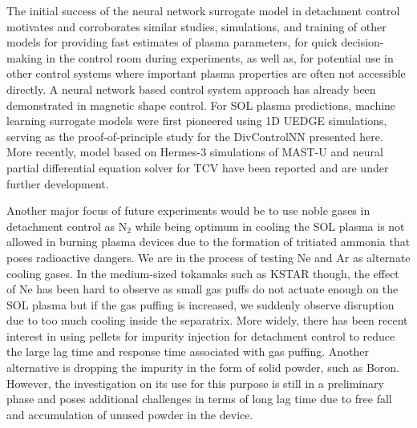 The initial success of the neural network surrogate model in detachment control motivates and corroborates similar studies, simulations, and training of other models for providing fast estimates of plasma parameters, for quick decision-making in the control room during experiments, as well as, for potential use in other control systems where important plasma properties are often not accessible directly.
A neural network based control system approach has already been demonstrated in magnetic shape control\cite{Degrave_2022_Nature}.
For \ac{SOL} plasma predictions, machine learning surrogate models were first pioneered using 1D UEDGE simulations\cite{Zhu_2022_JPP}, serving as the proof-of-principle study for the DivControlNN presented here. More recently, model based on Hermes-3\cite{Dudson_2024_CPC} simulations of MAST-U\cite{Holt_2024_NF} and neural partial differential equation solver for TCV\cite{Poels_2023_NF} have been reported and are under further development.

Another major focus of future experiments would be to use noble gases in detachment control as N$_2$ while being optimum in cooling the SOL plasma is not allowed in burning plasma devices due to the formation of tritiated ammonia that poses radioactive dangers.
We are in the process of testing Ne and Ar as alternate cooling gases.
In the medium-sized tokamaks such as KSTAR though, the effect of Ne has been hard to observe as small gas puffs do not actuate enough on the \ac{SOL} plasma but if the gas puffing is increased, we suddenly observe disruption due to too much cooling inside the separatrix.
More widely, there has been recent interest in using pellets for impurity injection for detachment control to reduce the large lag time and response time associated with gas puffing.
Another alternative is dropping the impurity in the form of solid powder, such as Boron.
However, the investigation on its use for this purpose is still in a preliminary phase and poses additional challenges in terms of long lag time due to free fall and accumulation of unused powder in the device.
